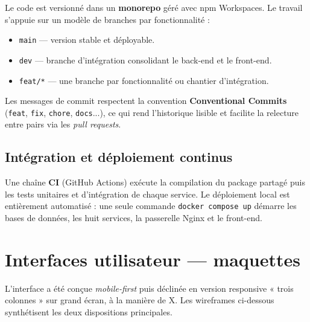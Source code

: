 Le code est versionné dans un \textbf{monorepo} géré avec npm Workspaces. Le
travail s'appuie sur un modèle de branches par fonctionnalité :

\begin{itemize}[leftmargin=1.4em]
  \item \texttt{main} — version stable et déployable.
  \item \texttt{dev} — branche d'intégration consolidant le back-end et le front-end.
  \item \texttt{feat/*} — une branche par fonctionnalité ou chantier d'intégration.
\end{itemize}

Les messages de commit respectent la convention \textbf{Conventional Commits}
(\texttt{feat}, \texttt{fix}, \texttt{chore}, \texttt{docs}...), ce qui rend
l'historique lisible et facilite la relecture entre pairs via les
\textit{pull requests}.

\subsection{Intégration et déploiement continus}

Une chaîne \textbf{CI} (GitHub Actions) exécute la compilation du package partagé
puis les tests unitaires et d'intégration de chaque service. Le déploiement local
est entièrement automatisé : une seule commande \texttt{docker compose up} démarre
les bases de données, les huit services, la passerelle Nginx et le front-end.

\newpage

\section{Interfaces utilisateur — maquettes}

L'interface a été conçue \textit{mobile-first} puis déclinée en version
responsive « trois colonnes » sur grand écran, à la manière de X. Les wireframes
ci-dessous synthétisent les deux dispositions principales.

